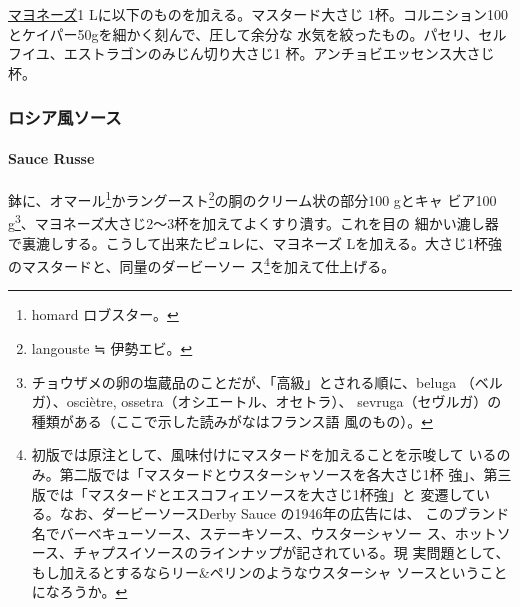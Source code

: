 \begin{recette}

\protect\hyperlink{mayonnaise}{マヨネーズ}1
Lに以下のものを加える。マスタード大さじ
1\undemi{}杯。コルニション100とケイパー50gを細かく刻んで、圧して余分な
水気を絞ったもの。パセリ、セルフイユ、エストラゴンのみじん切り大さじ1
杯。アンチョビエッセンス大さじ\undemi{}杯。

\maeaki

\hypertarget{ux30edux30b7ux30a2ux98a8ux30bdux30fcux30b9}{%
\subsubsection{ロシア風ソース}\label{ux30edux30b7ux30a2ux98a8ux30bdux30fcux30b9}}

\hypertarget{sauce-russe-froide}{%
\paragraph{Sauce Russe}\label{sauce-russe-froide}}


鉢に、オマール\footnote{homard ロブスター。}かラングースト\footnote{langouste
  ≒ 伊勢エビ。}の胴のクリーム状の部分100 gとキャ ビア100 g\footnote{チョウザメの卵の塩蔵品のことだが、「高級」とされる順に、beluga
  （ベルガ）、osciètre, ossetra（オシエートル、オセトラ）、
  sevruga（セヴルガ）の種類がある（ここで示した読みがなはフランス語
  風のもの）。}、マヨネーズ大さじ2〜3杯を加えてよくすり潰す。これを目の
細かい漉し器で裏漉しする。こうして出来たピュレに、マヨネーズ
\troisquarts{} Lを加える。大さじ1杯強のマスタードと、同量のダービーソー
ス\footnote{初版では原注として、風味付けにマスタードを加えることを示唆して
  いるのみ。第二版では「マスタードとウスターシャソースを各大さじ1杯
  強」、第三版では「マスタードとエスコフィエソースを大さじ1杯強」と
  変遷している。なお、ダービーソースDerby Sauce の1946年の広告には、
  このブランド名でバーベキューソース、ステーキソース、ウスターシャソー
  ス、ホットソース、チャプスイソースのラインナップが記されている。現
  実問題として、もし加えるとするならリー\&ペリンのようなウスターシャ
  ソースということになろうか。}を加えて仕上げる。


\end{recette}
